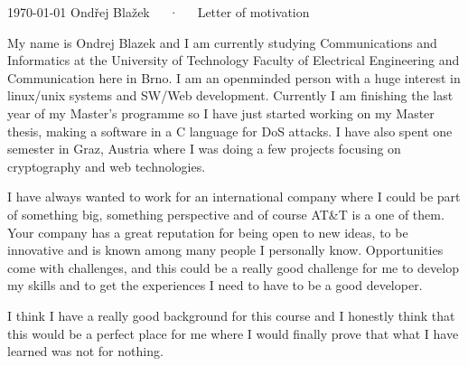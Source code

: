 \documentclass[11pt, a4paper]{awesome-cv}
\begin{document}
\makecvheader[R]

\makecvfooter
  {\today}
  {Ondřej Blažek~~~·~~~Letter of motivation}
  {}

\makelettertitle

\begin{cvletter}

My name is Ondrej Blazek and I am currently studying Communications and Informatics at the University of Technology Faculty of Electrical Engineering and Communication here in Brno. I am an openminded person with a huge interest in linux/unix systems and SW/Web development.
Currently I am finishing the last year of my Master's programme so I have just started working on my Master thesis, making a software in a C language for DoS attacks. I have also spent one
semester in Graz, Austria where I was doing a few projects focusing on cryptography and web technologies.

I have always wanted to work for an international company where I could be part of something big, something perspective and of course AT\&T is a one of them. 
Your company has a great reputation for being open to new ideas, to be innovative and is known among many people I personally know.
Opportunities come with challenges, and this could be a really good challenge for me to develop my skills and to get the experiences I need to have to be a good developer.


I think I have a really good background for this course and I honestly think that this would be a perfect place for me where I would finally prove that what I have learned was not for nothing.  
\end{cvletter}


\makeletterclosing
\end{document}
